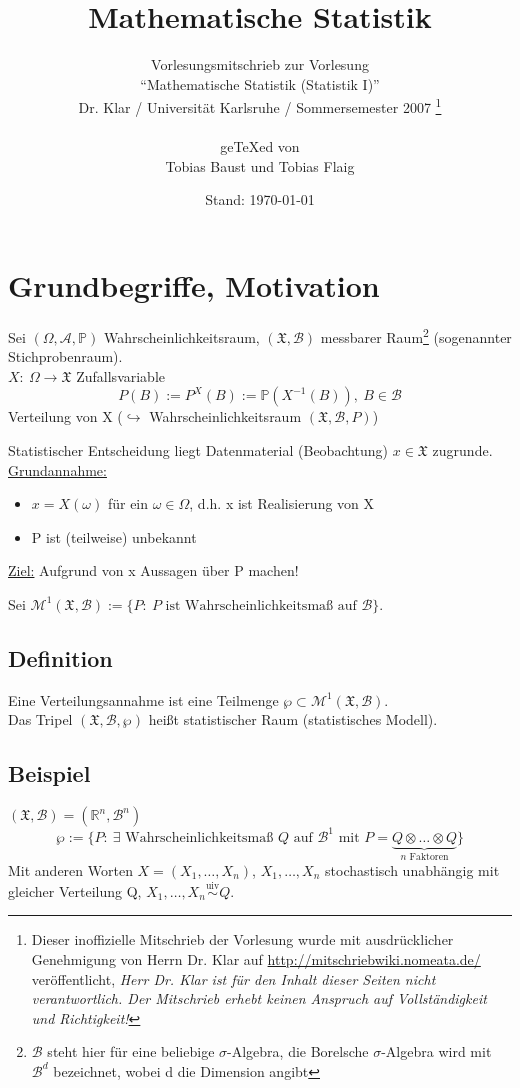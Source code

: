 \documentclass[a4paper,11pt,twoside,titlepage]{article}
\title{Mathematische Statistik}
\author{Vorlesungsmitschrieb zur Vorlesung\\ "`Mathematische Statistik (Statistik I)"'\\
Dr. Klar / Universität Karlsruhe / Sommersemester 2007
\footnote{
Dieser inoffizielle Mitschrieb der Vorlesung wurde mit ausdrücklicher Genehmigung von Herrn Dr. Klar auf \url{http://mitschriebwiki.nomeata.de/} veröffentlicht, \emph{Herr Dr. Klar ist für den Inhalt dieser Seiten nicht verantwortlich. Der Mitschrieb erhebt keinen Anspruch auf Vollständigkeit und Richtigkeit!}
}\\
~\\
ge\TeX ed von\\
Tobias Baust und Tobias Flaig}
\date{Stand: \today}
\newcommand{\R}{{\mathbb R}}
\newcommand{\PP}{{\mathbb P}} %
\newcommand{\XX}{{\mathfrak X}} %
\newcommand{\MM}{{\mathcal M}}
\newcommand\AAA{ \mathcal{A} } %
\newcommand\BB{ \mathcal{B} } %
\begin{document}
\setcounter{tocdepth}{1}
\renewcommand{\thepage}{\roman{page}}
\thispagestyle{empty}
\maketitle
\newpage
\thispagestyle{empty}
\tableofcontents
\thispagestyle{empty}
\cleardoublepage

\renewcommand{\thepage}{\arabic{page}}
\setcounter{page}{1}
\renewcommand{\thesection}{\arabic{section}}




\section{Grundbegriffe, Motivation}
Sei $(\Omega,\AAA,\PP)$ Wahrscheinlichkeitsraum, $(\XX,\BB)$ messbarer Raum\footnote{$\BB$ steht hier für eine beliebige $\sigma$-Algebra, die Borelsche $\sigma$-Algebra wird mit $\BB^d$ bezeichnet, wobei d die Dimension angibt} (sogenannter Stichprobenraum).\\
$X:\ \Omega\to\XX$ Zufallsvariable
\[P(B):=P^X(B):=\PP(X^{-1}(B)),\ B\in\BB\]
Verteilung von X ($\hookrightarrow$ Wahrscheinlichkeitsraum $(\XX,\BB,P)$)

Statistischer Entscheidung liegt Datenmaterial (Beobachtung) $x\in\XX$ zugrunde.\\
\underline{Grundannahme:}
\begin{itemize}
\item[1) ]$x=X(\omega)$ für ein $\omega\in\Omega$, d.h. x ist Realisierung von X
\item[2) ]P ist (teilweise) unbekannt
\end{itemize}
\underline{Ziel:} Aufgrund von x Aussagen über P machen!

Sei $\MM^1(\XX,\BB):=\{P:\ P\mbox{ ist Wahrscheinlichkeitsmaß auf }\BB\}$.

\subsection{Definition}
Eine Verteilungsannahme ist eine Teilmenge $\wp\subset\MM^1(\XX,\BB)$.\\
Das Tripel $(\XX,\BB,\wp)$ heißt statistischer Raum (statistisches Modell).

\subsection{Beispiel}
$(\XX,\BB)=(\R^n,\BB^n)$
\[\wp:=\{P:\ \exists\mbox{ Wahrscheinlichkeitsmaß } Q\mbox{ auf }\BB^1\mbox{ mit }P=\underbrace{Q\otimes\ldots\otimes Q}_{n\mbox{ Faktoren}}\}\]
Mit anderen Worten $X=(X_1,\ldots,X_n)$, $X_1,\ldots,X_n$ stochastisch unabhängig mit gleicher Verteilung Q, $X_1,\ldots,X_n\stackrel{\mbox{uiv}}{\sim}Q$.
\end{document}
